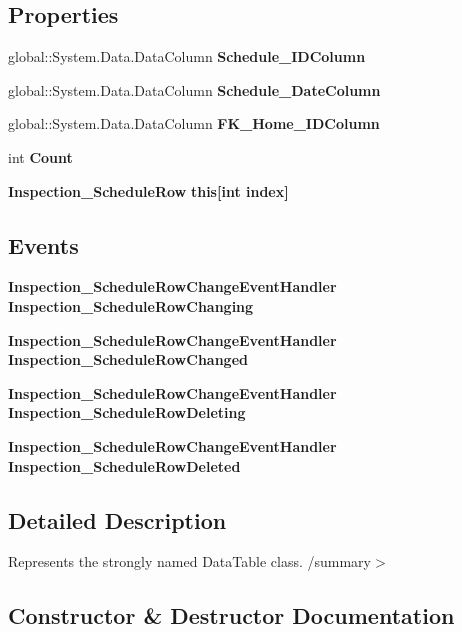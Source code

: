\subsection*{Properties}
\begin{DoxyCompactItemize}
\item 
global\+::\+System.\+Data.\+Data\+Column \textbf{ Schedule\+\_\+\+I\+D\+Column}\hspace{0.3cm}{\ttfamily  [get]}
\item 
global\+::\+System.\+Data.\+Data\+Column \textbf{ Schedule\+\_\+\+Date\+Column}\hspace{0.3cm}{\ttfamily  [get]}
\item 
global\+::\+System.\+Data.\+Data\+Column \textbf{ F\+K\+\_\+\+Home\+\_\+\+I\+D\+Column}\hspace{0.3cm}{\ttfamily  [get]}
\item 
int \textbf{ Count}\hspace{0.3cm}{\ttfamily  [get]}
\item 
\textbf{ Inspection\+\_\+\+Schedule\+Row} \textbf{ this[int index]}\hspace{0.3cm}{\ttfamily  [get]}
\end{DoxyCompactItemize}
\subsection*{Events}
\begin{DoxyCompactItemize}
\item 
\textbf{ Inspection\+\_\+\+Schedule\+Row\+Change\+Event\+Handler} \textbf{ Inspection\+\_\+\+Schedule\+Row\+Changing}
\item 
\textbf{ Inspection\+\_\+\+Schedule\+Row\+Change\+Event\+Handler} \textbf{ Inspection\+\_\+\+Schedule\+Row\+Changed}
\item 
\textbf{ Inspection\+\_\+\+Schedule\+Row\+Change\+Event\+Handler} \textbf{ Inspection\+\_\+\+Schedule\+Row\+Deleting}
\item 
\textbf{ Inspection\+\_\+\+Schedule\+Row\+Change\+Event\+Handler} \textbf{ Inspection\+\_\+\+Schedule\+Row\+Deleted}
\end{DoxyCompactItemize}


\subsection{Detailed Description}
Represents the strongly named Data\+Table class. /summary$>$ 

\subsection{Constructor \& Destructor Documentation}
\mbox{\label{class_a_f_h___scheduler_1_1_home_inspection_db_data_set_1_1_inspection___schedule_data_table_ab1f4f6f16aa3fc439b7ade91f5453157}} 
